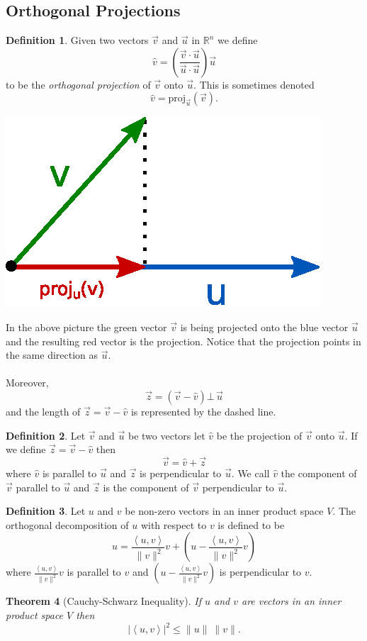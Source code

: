 \documentclass[12pt,letterpaper]{article}
\newcommand{\ip}[2]{\left\langle {#1}, {#2}\right\rangle}
\theoremstyle{plain}
\newtheorem{theorem}{Theorem}[section]
\theoremstyle{definition}
\newtheorem{definition}[theorem]{Definition}
\numberwithin{equation}{section}
\begin{document}
\subsection{Orthogonal Projections}
\begin{definition} Given two vectors $\vec{v}$ and $\vec{u}$ in $\mathbb{R}^n$ we define
\[\hat{v}=\left(\dfrac{\vec{v}\cdot \vec{u}}{\vec{u}\cdot \vec{u}}\right)\vec{u}\] to be the \emph{orthogonal projection} of $\vec{v}$ onto $\vec{u}$. 
This is sometimes denoted
\[\hat{v}=\text{proj}_{\vec{u}}(\vec{v}).\]
\begin{center}
\includegraphics[scale=.75]{vector_projection.eps}
\end{center}
\end{definition}
In the above picture the green vector $\vec{v}$ is being projected onto the blue vector $\vec{u}$ and the resulting red vector is the projection. Notice that the projection points in the same direction as $\vec{u}$. \\
\ \\
Moreover, 
\[\vec{z}=(\vec{v}-\hat{v})\bot\, \vec{u}\]
and the length of $\vec{z}=\vec{v}-\hat{v}$ is represented by the dashed line.
\begin{definition}
Let $\vec{v}$ and $\vec{u}$ be two vectors let $\hat{v}$ be the projection of $\vec{v}$ onto $\vec{u}$. If we define $\vec{z}=\vec{v}-\hat{v}$ then
\[\vec{v}=\hat{v}+\vec{z}\] where $\hat{v}$ is parallel to $\vec{u}$ and $\vec{z}$ is perpendicular to $\vec{u}$. We call $\hat{v}$ the component of $\vec{v}$ parallel to $\vec{u}$ and $\vec{z}$ is the component of $\vec{v}$ perpendicular to $\vec{u}$. 
\end{definition}
\begin{definition} Let $u$ and $v$ be non-zero vectors in an inner product space $V$. The orthogonal decomposition of $u$ with respect to $v$ is defined to be 
\[u=\frac{\ip{u}{v}}{\ \|v\|^2}v+\left(u-\frac{\ip{u}{v}}{\|v\|^2}v\right)\]
where $\frac{\ip{u}{v}}{\ \|v\|^2}v$ is parallel to $v$ and $\left(u-\frac{\ip{u}{v}}{\ \|v\|^2}v\right)$ is perpendicular to $v$. 
\end{definition}
\begin{theorem}[Cauchy-Schwarz Inequality]If $u$ and $v$ are vectors in an inner product space $V$ then 
\[\left|\ip{u}{v}\right|^2\leq \|u\|\ \|v\|.\]
\end{theorem}
\end{document}
